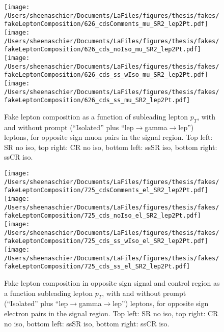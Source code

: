  
\begin{figure}[htb]
        \centering
        \texttt{[image: /Users/sheenaschier/Documents/LaFiles/figures/thesis/fakes/fakeLeptonComposition/626\_cdsComments\_mu\_SR2\_lep2Pt.pdf]}
       \texttt{[image: /Users/sheenaschier/Documents/LaFiles/figures/thesis/fakes/fakeLeptonComposition/626\_cds\_noIso\_mu\_SR2\_lep2Pt.pdf]}
      \texttt{[image: /Users/sheenaschier/Documents/LaFiles/figures/thesis/fakes/fakeLeptonComposition/626\_cds\_ss\_wIso\_mu\_SR2\_lep2Pt.pdf]}
      \texttt{[image: /Users/sheenaschier/Documents/LaFiles/figures/thesis/fakes/fakeLeptonComposition/626\_cds\_ss\_mu\_SR2\_lep2Pt.pdf]}
        \caption{Fake lepton composition as a function of subleading lepton $p_{T}$, with and without prompt (``Isolated'' plus ``lep$\to$gamma$\to$lep'') leptons, for opposite sign muon pairs in the signal region.  Top left: SR no iso, top right: CR no iso, bottom left: ssSR iso, bottom right: ssCR iso.}
        \label{fig:muMC}
\end{figure}

 
\begin{figure}[htb]
        \centering
        \texttt{[image: /Users/sheenaschier/Documents/LaFiles/figures/thesis/fakes/fakeLeptonComposition/725\_cdsComments\_el\_SR2\_lep2Pt.pdf]}
        \texttt{[image: /Users/sheenaschier/Documents/LaFiles/figures/thesis/fakes/fakeLeptonComposition/725\_cds\_noIso\_el\_SR2\_lep2Pt.pdf]}
        \texttt{[image: /Users/sheenaschier/Documents/LaFiles/figures/thesis/fakes/fakeLeptonComposition/725\_cds\_ss\_wIso\_el\_SR2\_lep2Pt.pdf]}
          \texttt{[image: /Users/sheenaschier/Documents/LaFiles/figures/thesis/fakes/fakeLeptonComposition/725\_cds\_ss\_el\_SR2\_lep2Pt.pdf]}
        \caption{Fake lepton composition in opposite sign signal and control region as a function subleading lepton $p_{T}$, with and without prompt (``Isolated'' plus ``lep$\to$gamma$\to$lep'') leptons, for opposite sign electron pairs in the signal region.  Top left: SR no iso, top right: CR no iso, bottom left: ssSR iso, bottom right: ssCR iso.} 
        \label{fig:elMC}
\end{figure}

